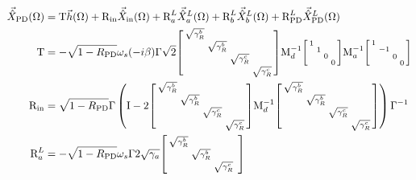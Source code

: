 \begin{align}\label{eq:nIS_Xpd}
\vec{\hat X}_\mathrm{PD}(\Omega)&=\text{T}\vec h(\Omega)+\text{R}_\text{in}\vec{\hat X}_\mathrm{in}(\Omega)+\text{R}^L_a\vec{\hat X}^L_a(\Omega)+\text{R}^L_b\vec{\hat X}^L_b(\Omega)+\text{R}^L_\text{PD}\vec{\hat X}^L_\text{PD}(\Omega)\\
\text{T}&=-\sqrt{1-R_\text{PD}}\omega_s(-i\beta)\Gamma \sqrt{2}\begin{bsmallmatrix}
\sqrt{\gamma^b_R} &  &  &  \\
 & \sqrt{\gamma^b_R} &  &  \\
 &  & \sqrt{\gamma^c_R} &  \\
 &  &  & \sqrt{\gamma^c_R}
\end{bsmallmatrix}\text{M}_d^{-1}\begin{bsmallmatrix}
1 &  &  &  \\
 & 1 &  &  \\
 &  & 0 &  \\
 &  &  & 0
\end{bsmallmatrix}\text{M}_a^{-1}\begin{bsmallmatrix}
1 &  &  &  \\
 & -1 &  &  \\
 &  & 0 &  \\
 &  &  & 0
\end{bsmallmatrix}\\
\text{R}_\text{in}&=\sqrt{1-R_\text{PD}}\Gamma\left(\text{I}-2\begin{bsmallmatrix}
\sqrt{\gamma^b_R} &  &  &  \\
 & \sqrt{\gamma^b_R} &  &  \\
 &  & \sqrt{\gamma^c_R} &  \\
 &  &  & \sqrt{\gamma^c_R}
\end{bsmallmatrix}\text{M}_d^{-1}\begin{bsmallmatrix}
\sqrt{\gamma^b_R} &  &  &  \\
 & \sqrt{\gamma^b_R} &  &  \\
 &  & \sqrt{\gamma^c_R} &  \\
 &  &  & \sqrt{\gamma^c_R}
\end{bsmallmatrix}\right)\Gamma^{-1}\\
\text{R}^L_a&=-\sqrt{1-R_\text{PD}}\omega_s\Gamma 2\sqrt{\gamma_a}\begin{bsmallmatrix}
\sqrt{\gamma^b_R} &  &  &  \\
 & \sqrt{\gamma^b_R} &  &  \\
 &  & \sqrt{\gamma^c_R} &  \\

\end{bsmallmatrix}
\end{align}
